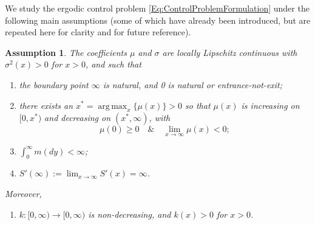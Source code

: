 \documentclass[12pt]{article}
\newtheorem{assumption}[theorem]{Assumption}
\DeclareMathOperator*{\argmax}{arg\,max}
\begin{document}
We study the ergodic control problem \eqref{Eq:ControlProblemFormulation} under the following main assumptions (some of which have already been introduced, but are repeated here for clarity and for future reference).



\begin{assumption} \label{Ass:MainAssumptions} 
The coefficients $\mu$ and $\sigma$ are locally Lipschitz continuous with $\sigma^2(x)>0$ for $x>0$, and such that 
    \begin{enumerate}     
            \item[(i)]
            the boundary point $\infty$ is natural, and 0 is natural or entrance-not-exit;
            \item[(ii)]
        there exists an $x^* =\argmax_x \{ \mu(x) \}>0$ so that $\mu(x)$ is increasing on $[0, x^*)$ and decreasing on $(x^*, \infty)$, with
        \[ \mu(0) \geq 0 \quad\&\quad\lim_{x \to \infty} \mu(x) < 0;\]
        \item[(iii)]
        $\int_0^{\infty} m(dy) <\infty$;
        \item[(iv)]
        $S'(\infty):=\lim_{x\to\infty}S'(x)=\infty$.
    \end{enumerate}
    Moreover, 
      \begin{enumerate}     
            \item[(v)]
            $k:[0,\infty)\to[0,\infty)$ is non-decreasing, and $k(x)>0$ for $x>0$.
              \end{enumerate}
\end{assumption}
\end{document}
